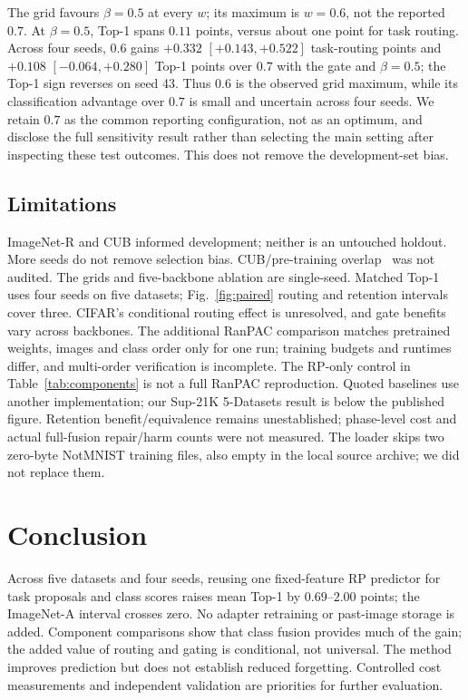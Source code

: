 \documentclass[runningheads]{llncs}
\begin{document}
The grid favours $\beta=0.5$ at every $w$; its maximum is $w=0.6$, not the
reported $0.7$. At $\beta=0.5$, Top-1 spans $0.11$ points, versus
about one point for task routing. Across four seeds, $0.6$ gains
$+0.332$ $[+0.143,+0.522]$ task-routing points and
$+0.108$ $[-0.064,+0.280]$ Top-1 points over $0.7$ with the gate and
$\beta=0.5$; the Top-1 sign reverses on seed 43.
Thus $0.6$ is the observed grid maximum, while its classification advantage
over $0.7$ is small and uncertain across four seeds. We retain $0.7$ as the
common reporting configuration, not as an optimum, and disclose the full
sensitivity result rather than selecting the main setting after inspecting
these test outcomes. This does not remove the development-set bias.

\subsection{Limitations}
\label{sec:limits}

ImageNet-R and CUB informed development; neither is an untouched holdout.
More seeds do not remove selection bias. CUB/pre-training overlap~\cite{ref_cub}
was not audited. The grids and five-backbone ablation are single-seed. Matched
Top-1 uses four seeds on five datasets; Fig.~\ref{fig:paired} routing and
retention intervals cover three. CIFAR's conditional routing effect is
unresolved, and gate benefits vary across backbones.
The additional RanPAC comparison matches pretrained weights, images and class
order only for one run; training budgets and runtimes differ, and multi-order
verification is incomplete. The RP-only control in Table~\ref{tab:components}
is not a full RanPAC reproduction. Quoted baselines use another implementation;
our Sup-21K 5-Datasets result is below the published figure. Retention benefit/equivalence remains
unestablished; phase-level cost and actual full-fusion repair/harm counts
were not measured.
The loader skips two zero-byte NotMNIST training files, also empty in the
local source archive; we did not replace them.

\section{Conclusion}

Across five datasets and four seeds, reusing one fixed-feature RP predictor for
task proposals and class scores raises mean Top-1 by $0.69$--$2.00$ points;
the ImageNet-A interval crosses zero. No adapter retraining or past-image
storage is added. Component
comparisons show that class fusion provides much of the gain; the added value
of routing and gating is conditional, not universal. The method improves
prediction but does not establish reduced forgetting. Controlled cost
measurements and independent validation are priorities for further evaluation.
\end{document}
